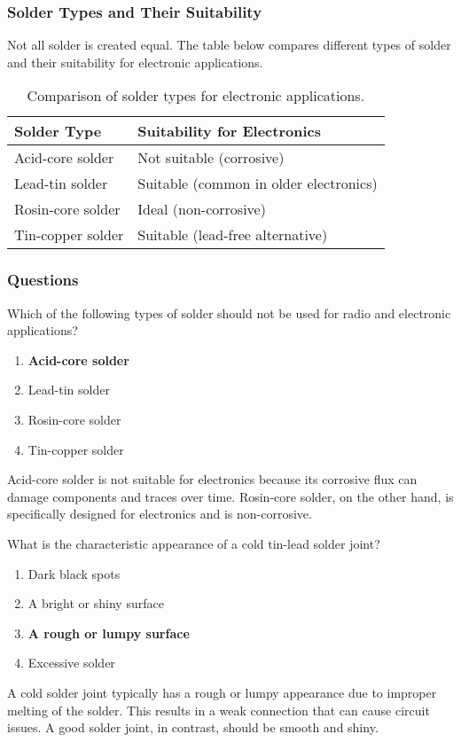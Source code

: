 \subsubsection*{Solder Types and Their Suitability}
Not all solder is created equal. The table below compares different types of solder and their suitability for electronic applications.

\begin{table}[h]
    \centering
    \caption{Comparison of solder types for electronic applications.}
    \label{tab:solder-types}
    \begin{tabular}{|l|l|}
        \hline
        \textbf{Solder Type} & \textbf{Suitability for Electronics} \\
        \hline
        Acid-core solder & Not suitable (corrosive) \\
        Lead-tin solder & Suitable (common in older electronics) \\
        Rosin-core solder & Ideal (non-corrosive) \\
        Tin-copper solder & Suitable (lead-free alternative) \\
        \hline
    \end{tabular}
\end{table}

\subsubsection*{Questions}
\begin{tcolorbox}[colback=gray!10!white,colframe=black!75!black,title={T7D08}]
    Which of the following types of solder should not be used for radio and electronic applications?
    \begin{enumerate}[label=\Alph*),noitemsep]
        \item \textbf{Acid-core solder}
        \item Lead-tin solder
        \item Rosin-core solder
        \item Tin-copper solder
    \end{enumerate}
\end{tcolorbox}

Acid-core solder is not suitable for electronics because its corrosive flux can damage components and traces over time. Rosin-core solder, on the other hand, is specifically designed for electronics and is non-corrosive.

\begin{tcolorbox}[colback=gray!10!white,colframe=black!75!black,title={T7D09}]
    What is the characteristic appearance of a cold tin-lead solder joint?
    \begin{enumerate}[label=\Alph*),noitemsep]
        \item Dark black spots
        \item A bright or shiny surface
        \item \textbf{A rough or lumpy surface}
        \item Excessive solder
    \end{enumerate}
\end{tcolorbox}

A cold solder joint typically has a rough or lumpy appearance due to improper melting of the solder. This results in a weak connection that can cause circuit issues. A good solder joint, in contrast, should be smooth and shiny.
